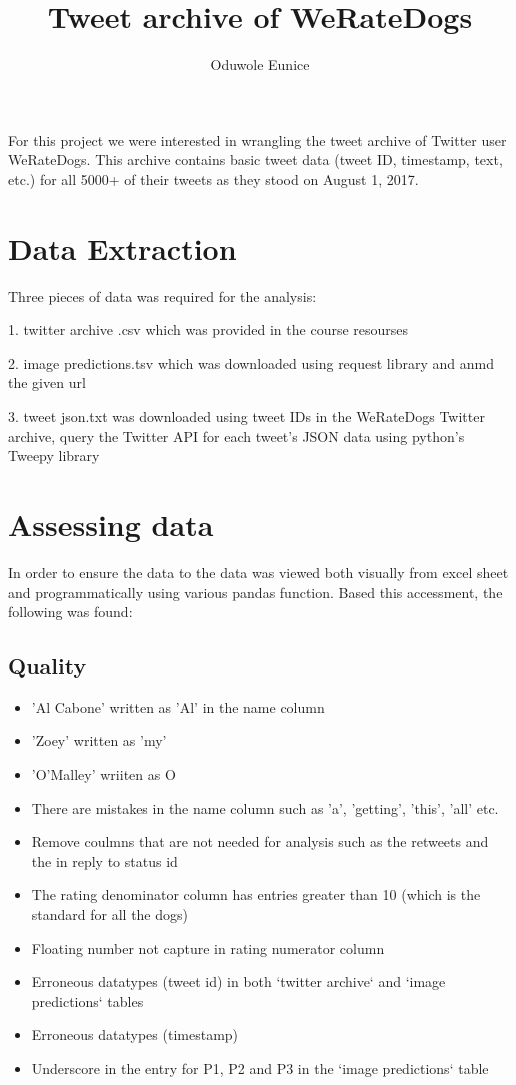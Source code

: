 \documentclass[10pt,a4paper]{article}
\author{Oduwole Eunice}
\title{ Tweet archive of  WeRateDogs}
\begin{document}
\maketitle
\noindent For this project we were interested in wrangling  the tweet archive of Twitter user WeRateDogs. This archive contains basic tweet data (tweet ID, timestamp, text, etc.) for all 5000+ of their tweets as they stood on August 1, 2017.


\section*{Data Extraction}
\noindent Three pieces of data was required for the analysis:
\begin{list}{}{}
\item[1.] twitter archive .csv which was provided in the course resourses
\item[2.]image predictions.tsv which was downloaded using request library and anmd the given url 
\item[3.]tweet json.txt was downloaded using tweet IDs in the WeRateDogs Twitter archive, query the Twitter API for each tweet's JSON data using python's Tweepy library 
\end{list}


\section*{Assessing data}
In order to ensure the data to the data was viewed both visually from excel sheet and programmatically using various pandas function. Based this accessment, the following was found:
\subsection*{ Quality}
\begin{itemize}
\item  'Al Cabone' written as 'Al' in the name column
\item 'Zoey' written as 'my'
\item 'O'Malley' wriiten as O
\item There are mistakes in the name column such as 'a', 'getting', 'this', 'all' etc.
\item Remove coulmns that are not needed for analysis such as the retweets and the in reply to status id
\item The rating denominator column has entries greater than 10 (which is the standard for all the dogs)
\item Floating number not capture in  rating numerator column 
\item  Erroneous datatypes (tweet id) in both `twitter archive` and `image predictions` tables
\item  Erroneous datatypes (timestamp)
\item Underscore in the entry for  P1, P2 and P3 in the `image predictions` table
\end{itemize}
\end{document}
